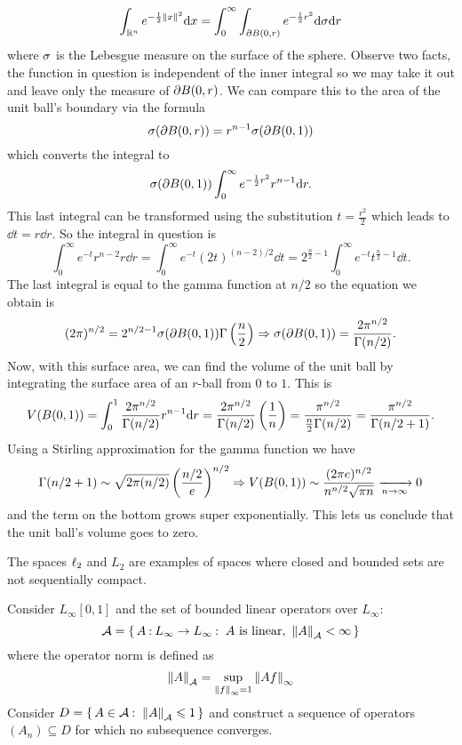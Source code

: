 \documentclass[12pt]{memoir}
\begin{document}
\begin{ptcbr}
\begin{enumerate}[i)]
        $$\int_{\bR^n}e^{-\half\norm{x}^2}\dd x=\int_0^\infty\int_{\del B(0,r)}e^{-\half r^2}\dd\sg\dd r$$
        where $\sigma$ is the Lebesgue measure on the surface of the sphere. Observe two facts, the function in question is independent of the inner integral so we may take it out and leave only the measure of $\partial B(0,r)$. We can compare this to the area of the unit ball's boundary via the formula 
        $$\sigma(\partial B(0,r))=r^{n-1}\sigma(\partial B(0,1))$$
        which converts the integral to 
        $$\sg(\del B(0,1))\int_0^\infty e^{-\half r^2}r^{n-1}\dd r.$$
        This last integral can be transformed using the substitution $t=\frac{r^2}{2}$ which leads to $\dd t= r\dd r$. So the integral in question is 
        $$\int_0^\infty e^{-t}r^{n-2}r\dd r=\int_0^\infty e^{-t}(2t)^{(n-2)/2}\dd t=2^{\frac{n}{2}-1}\int_0^\infty e^{-t}t^{\frac{n}{2}-1}\dd t.$$
        The last integral is equal to the gamma function at $n/2$ so the equation we obtain is 
        $$(2\pi)^{n/2}=2^{n/2-1}\sigma(\partial B(0,1))\Gamma\left(\frac{n}{2}\right)\Rightarrow\sigma(\partial B(0,1))=\frac{2\pi^{n/2}}{\Gamma(n/2)}.$$
        Now, with this surface area, we can find the volume of the unit ball by integrating the surface area of an $r$-ball from $0$ to $1$. This is 
        $$V(B(0,1))=\int_0^1\frac{2\pi^{n/2}}{\Gamma(n/2)}r^{n-1}\dd r=\frac{2\pi^{n/2}}{\Gamma(n/2)}\left(\frac{1}{n}\right)=\frac{\pi^{n/2}}{\frac{n}{2}\Gamma(n/2)}=\frac{\pi^{n/2}}{\Gamma(n/2+1)}.$$
        Using a Stirling approximation for the gamma function we have 
        $$\Gamma(n/2+1)\sim\sqrt{2\pi(n/2)}\left(\frac{n/2}{e}\right)^{n/2}\Rightarrow V(B(0,1))\sim \frac{(2\pi e)^{n/2}}{n^{n/2}\sqrt{\pi n}}\xrightarrow[n\to\infty]{}0$$
        and the term on the bottom grows super exponentially. This lets us conclude that the unit ball's volume goes to zero.
    \end{enumerate}
\end{ptcbr}

\begin{Ej}
    The spaces $\ell_2$ and $L_2$ are examples of spaces where closed and bounded sets are not sequentially compact.\par 
    Consider $L_\infty[0,1]$ and the set of bounded linear operators over $L_\infty$: 
    $$\cA=\set{A\: L_\infty\to L_\infty\:\ A\ \text{is linear},\ \norm{A}_\cA<\infty}$$
    where the operator norm is defined as 
    $$\norm{A}_{\mathcal{A}}=\sup_{\norm{f}_{\infty}=1}\norm{Af}_{\infty}$$
    Consider $D=\{\,A\in\mathcal{A}\mathbin{:}\ \norm{A}_{\mathcal{A}}\leqslant 1\,\}$ and construct a sequence of operators $(A_n)\subseteq D$ for which no subsequence converges.
\end{Ej}
\end{document}
